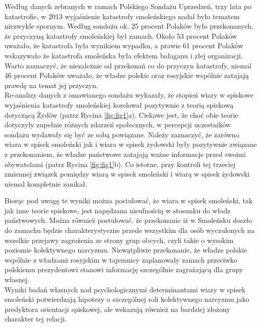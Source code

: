 \documentclass[man]{apa6}
\begin{document}
    Według danych zebranych w ramach Polskiego Sondażu Uprzedzeń, trzy lata po katastrofie, w 2013 wyjaśnienie katastrofy smoleńskiego nadal było tematem niezwykle spornym. Według sondażu \parencite[patrz,][]{soral2015socjo} ok. 25 procent Polaków było przekonanych, że przyczyną katastrofy smoleńskiej był zamach. Około 53 procent Polaków uważało, że katastrofa była wynikiem wypadku, a prawie 61 procent Polaków wskazywało że katastrofa smoleńska była efektem bałaganu i złej organizacji. Warto zaznaczyć, że niezależnie od przekonań co do przyczyn katastrofy, niemal 46 procent Polaków uważało, że władze polskie oraz rosyjskie wspólnie zatajają prawdę na temat jej przyczyn.\\
    Re-analizy danych z omawianego sondażu wykazały, że stopień wiary w spiskowe wyjaśnienia katastrofy smoleńskiej korelował pozytywnie z teorią spiskową dotyczącą Żydów (patrz Rycina \ref{fig:fig1}a). Ciekawe jest, że choć obie teorie dotyczyły zupełnie różnych zdarzeń społecznych, w percepcji uczestników sondażu wydawały się być ze sobą powiązane. Należy zaznaczyć, że zarówno wiara w spisek smoleński jak i wiara w spisek żydowski były pozytywnie związane z przekonaniem, że władze państwowe zatajają ważne informacje przed swoimi obywatelami (patrz Rycina \ref{fig:fig1}b). Co istotne, przy kontroli tej trzeciej zmiennej związek pomiędzy wiarą w spisek smoleński i wiarą w spisek żydowski niemal kompletnie zanikał.\\
    
	\begin{figure*}[htbp]
   		\centering
   		\caption{Związek pomiędzy wiarą w spisek smoleński a antysemityzmem spiskowym, bez -- a -- i przy kontroli -- b -- poziomu przekonania, że władze zatajają informacje przed obywatelami. \\ *$p$ < 0,05 **$p$ < 0,01 **$p$ < 0,001}
   		\label{fig:fig1}
	\end{figure*}
	
	Biorąc pod uwagę te wyniki można postulować, że wiara w spisek smoleński, tak jak inne teorie spiskowe, jest napędzana nieufnością w stosunku do władz państwowych. Można również postulować, że przekonanie iż w Smoleńsku doszło do zamachu będzie charakterystyczne przede wszystkim dla osób wyczulonych na wszelkie przejawy zagrożenia ze strony grup obcych, czyli takie o wysokim poziomie kolektywnego narcyzmu. Niewątpliwie przekonanie, że władze polskie wspólnie z władzami rosyjskim w tajemnicy zaplanowały zamach przeciwko polskiemu prezydentowi stanowi informację szczególnie zagrażającą dla grupy własnej.\\
	Wyniki badań własnych nad psychologicznymi determinantami wiary w spisek smoleński potwierdzają hipotezy o szczególnej roli kolektywnego narcyzmu jako predyktora orientacji spiskowej, ale wskazują również na bardziej złożony charakter tej relacji.
	
\end{document}
